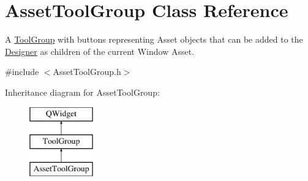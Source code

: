 \hypertarget{class_asset_tool_group}{\section{Asset\-Tool\-Group Class Reference}
\label{class_asset_tool_group}
}


A \hyperlink{class_tool_group}{Tool\-Group} with buttons representing Asset objects that can be added to the \hyperlink{class_designer}{Designer} as children of the current Window Asset.  




{\ttfamily \#include $<$Asset\-Tool\-Group.\-h$>$}

Inheritance diagram for Asset\-Tool\-Group\-:\begin{figure}[H]
\begin{center}
\leavevmode
\includegraphics[height=3.000000cm]{class_asset_tool_group}
\end{center}
\end{figure}
